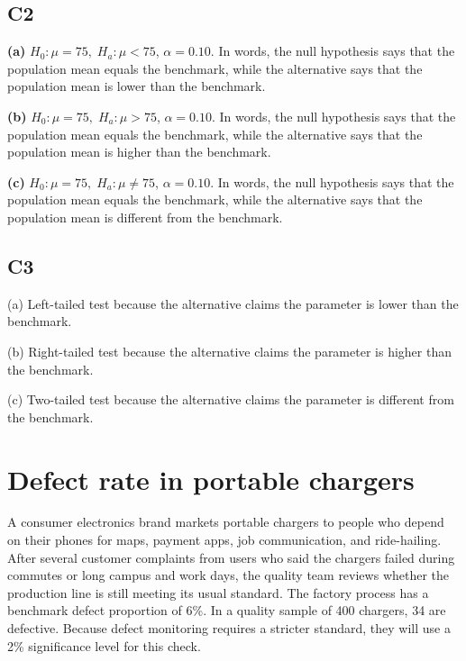 		\subsection*{C2}
		\textbf{(a)} \(H_0\colon \mu=75,\; H_a\colon \mu<75\), \(\alpha=0.10\). In words, the null hypothesis says that the population mean equals the benchmark, while the alternative says that the population mean is lower than the benchmark.
		
		\textbf{(b)} \(H_0\colon \mu=75,\; H_a\colon \mu>75\), \(\alpha=0.10\). In words, the null hypothesis says that the population mean equals the benchmark, while the alternative says that the population mean is higher than the benchmark.
		
		\textbf{(c)} \(H_0\colon \mu=75,\; H_a\colon \mu\ne 75\), \(\alpha=0.10\). In words, the null hypothesis says that the population mean equals the benchmark, while the alternative says that the population mean is different from the benchmark.
		
		\subsection*{C3}
		(a) Left-tailed test because the alternative claims the parameter is lower than the benchmark.\LeftTailGraph
		
		(b) Right-tailed test because the alternative claims the parameter is higher than the benchmark.\RightTailGraph
		
		(c) Two-tailed test because the alternative claims the parameter is different from the benchmark.\TwoTailGraph
		

	\section{Defect rate in portable chargers}
		A consumer electronics brand markets portable chargers to people who depend on their phones for maps, payment apps, job communication, and ride-hailing. After several customer complaints from users who said the chargers failed during commutes or long campus and work days, the quality team reviews whether the production line is still meeting its usual standard. The factory process has a benchmark defect proportion of 6\%. In a quality sample of 400 chargers, 34 are defective. Because defect monitoring requires a stricter standard, they will use a 2\% significance level for this check.
		

